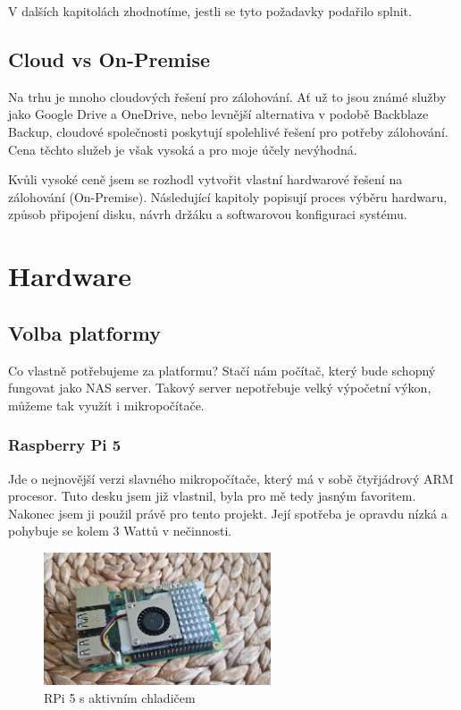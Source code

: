 \documentclass[a4paper,12pt, oneside]{book}
\begin{document}
V dalších kapitolách zhodnotíme, jestli se tyto
požadavky podařilo splnit.


\section{Cloud vs On-Premise}

Na trhu je mnoho cloudových řešení pro zálohování. Ať už to jsou známé služby
jako Google Drive a OneDrive, nebo levnější alternativa v podobě Back\-blaze
Backup, cloudové společnosti poskytují spolehlivé řešení pro potřeby zálohování.
Cena těchto služeb je však vysoká a pro moje účely nevýhodná. 

Kvůli vysoké ceně jsem se rozhodl vytvořit vlastní hardwarové řešení na
zálohování (On-Premise).
Následující kapitoly popisují
proces výběru hardwaru, způsob připojení disku, návrh držáku a softwarovou
konfiguraci systému. 


\chapter{Hardware}
\section{Volba platformy}

Co vlastně potřebujeme za platformu? Stačí nám počítač, který bude 
schopný fungovat jako NAS server. Takový server nepotřebuje velký
výpočetní výkon, můžeme tak využít i mikropočítače. 


\subsection{Raspberry Pi 5}

Jde o nejnovější verzi slavného mikropočítače, který má v sobě čtyřjádrový ARM
procesor. Tuto desku jsem již vlastnil, byla pro mě tedy jasným favoritem.
Nakonec jsem ji použil právě pro tento projekt. Její spotřeba je opravdu nízká
a pohybuje se kolem 3 Wattů v nečinnosti.  \cite{RPi-Power}

\begin{figure}[h]
	\centering
	\includegraphics[width=0.6\textwidth]{img/rpi5-active-cooler-c.jpg}
	\caption{RPi 5 s aktivním chladičem}
\end{figure}
\end{document}

